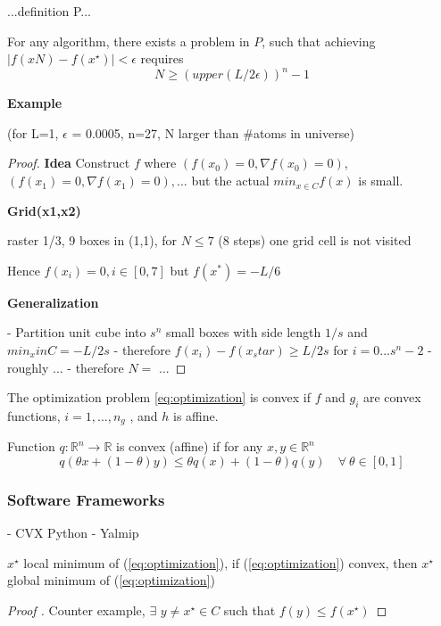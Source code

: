 ...definition P... %

\begin{proposition}
	For any algorithm, there exists a problem in $P$, such that achieving $|f (xN ) − f (x^⋆)| < ϵ$ requires
	$$
		N \ge (upper(L/{2\epsilon}))^n -1
	$$
\end{proposition}

\textbf{Example}

(for L=1, $\epsilon$ = 0.0005, n=27, N larger than \#atoms in universe)

\begin{proof}[Proof]
	\textbf{Idea}
	Construct $f$ where $(f(x_0) = 0,\nabla f(x_0) = 0)$, $(f(x_1) = 0,\nabla f(x_1) = 0),...$ but the actual $min_{x \in C}f(x)$ is small.

	\textbf{Grid(x1,x2)}

	raster 1/3, 9 boxes in (1,1), for $N\le 7$ (8 steps) one grid cell is not visited

	Hence $f(x_i) = 0, i \in [0,7]$ but $f(x^*) = -L/6$

	\textbf{Generalization}

	- Partition unit cube into $s^n$ small boxes with side length $1/s$ and $min_xinC = -L/2s$
	- therefore $f(x_i)-f(x_star) \ge L/2s$ for $i=0...s^n-2$
	- roughly ...
	- therefore $N=$ ...

\end{proof}

\begin{definition}[]
	The optimization problem \ref{eq:optimization} is convex
	if $f$ and $g_i$ are convex functions,
	$i = 1, . . . , n_g$ ,
	and $h$ is affine.
\end{definition}

\begin{definition}[]
	Function $q: \mathbb{R}^{n}\rightarrow\mathbb{R}$
	is convex (affine)
	if for any $x, y \in \mathbb{R}^{n}$
	$$
		q(\theta x+(1 − \theta)y) \le \theta q(x) + (1 − \theta)q(y)\quad\forall\ \theta \in [0, 1]
	$$
\end{definition}

\subsubsection{Software Frameworks}

- CVX Python
- Yalmip

\begin{proposition}
	$x^\star$ local minimum of (\ref{eq:optimization}),
	if (\ref{eq:optimization}) convex,
	then $x^\star$ global minimum of (\ref{eq:optimization})
\end{proposition}


\begin{proof}[Proof ]
	Counter example, $\exists$ $y\ne x^\star \in C$ such that $f(y)\le f(x^\star)$
\end{proof}

